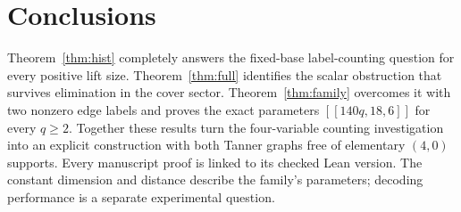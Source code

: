 \documentclass[11pt]{article}
\begin{document}
\section{Conclusions}
Theorem~\ref{thm:hist} completely answers the fixed-base label-counting
question for every positive lift size. Theorem~\ref{thm:full} identifies the
scalar obstruction that survives elimination in the cover sector.
Theorem~\ref{thm:family} overcomes it with two nonzero edge labels and proves
the exact parameters $[[140q,18,6]]$ for every $q\geq2$. Together these results
turn the four-variable counting investigation into an explicit construction
with both Tanner graphs free of elementary $(4,0)$ supports. Every manuscript
proof is linked to its checked Lean version. The constant dimension and
distance describe the family's parameters; decoding performance is a separate
experimental question.

\appendix
\end{document}
